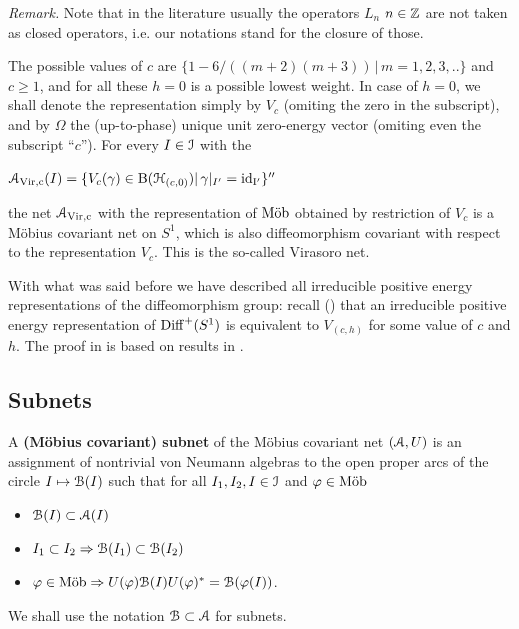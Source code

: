 \documentclass[12pt]{article}
\begin{document}
\smallskip

{\it Remark.}
Note that in the literature usually the operators $L_n$ $n\in{\mathbb Z}$ 
are not taken as closed operators, i.e. our notations stand for the
closure of those. 

\smallskip

The possible values of $c$ are 
$\{1-6/((m+2)(m+3))\,|\,m=1,2,3,..\}$ and $c \geq 1$, and 
for all these $h=0$ is a possible lowest weight. In case
of $h=0$, we shall denote the representation simply by 
$V_c$ (omiting the zero in the subscript), and by 
$\Omega$ the (up-to-phase) unique unit zero-energy vector 
(omiting even the subscript ``$c$''). 
For every $I \in {\mathcal I}$ with the
\begin{definition}
${\mathcal A}_{\rm{Vir},c}(I)=\{V_{c}(\gamma)\in {\rm B}({\mathcal H}_{(c,0)})| 
\,\gamma|_{I'}=\rm{id}_{I'}\}''$
\end{definition} \noindent
the net ${\mathcal A}_{\rm{Vir},c}$ with 
the representation of $\text {M\"{o}b}$ obtained by restriction of $V_c$ is a 
M\"obius covariant net on $S^1$, which is also diffeomorphism 
covariant with respect to the representation
$V_c$. This is the so-called Virasoro net.

With what was said before we have described all irreducible 
positive energy
representations of the diffeomorphism group: recall 
(\cite[Theorem A.1]{Carpi03b}) that
an irreducible positive energy representation of ${{\rm Diff}^+(S^1)}$ is equivalent
to $V_{(c,h)}$ for some value of $c$ and $h$.
The proof in \cite{Carpi03b} is based on results in \cite{loke}.

\subsection{Subnets}

A {\bf (M\"obius covariant) subnet} of the M\"obius covariant net
$({\mathcal A},U)$ is an assignment of nontrivial von Neumann algebras to the open 
proper arcs of the circle $I \mapsto {\mathcal B}(I)$ such that for all $I_1,I_2,I 
\in {\mathcal I}$ and $\varphi \in \text {M\"{o}b}$
\begin{itemize}
\item[(i)] 
${\mathcal B}(I) \subset {\mathcal A}(I)$ 
\item[(ii)]
$I_1 \subset I_2 \Rightarrow {\mathcal B}(I_1) \subset {\mathcal B}(I_2)$ 
\item[(iii)] 
$\varphi \in \text {M\"{o}b} \Rightarrow U(\varphi){\mathcal B}(I)U(\varphi)^* = 
{\mathcal B}(\varphi(I))$. 
\end{itemize} 
We shall use the notation ${\mathcal B} \subset {\mathcal A}$ for  subnets.
\end{document}
